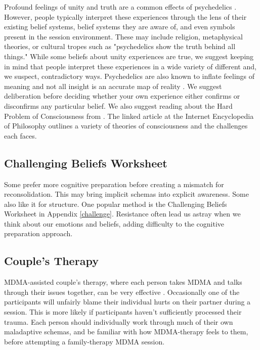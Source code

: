 \documentclass[12pt,letterpaper]{book}
\begin{document}
Profound feelings of unity and truth are a common effects of psychedelics \cite{yaden2022varieties}. However, people typically interpret these experiences through the lens of their existing belief systems, belief systems they are aware of, and even symbols present in the session environment. These may include religion, metaphysical theories, or cultural tropes such as "psychedelics show the truth behind all things." While some beliefs about unity experiences are true, we suggest keeping in mind that people interpret these experiences in a wide variety of different and, we suspect, contradictory ways. Psychedelics are also known to inflate feelings of meaning and not all insight is an accurate map of reality \cite{hartogsohn2018meaning,tulverInsight}. We suggest deliberation before deciding whether your own experience either confirms or disconfirms any particular belief. We also suggest reading about the Hard Problem of Consciousness from \textcite{hardProblem}. The linked article at the Internet Encyclopedia of Philosophy outlines a variety of theories of consciousness and the challenges each faces.
\subsection{Challenging Beliefs Worksheet}
\label{challengingBeliefsWorksheet}
Some prefer more cognitive preparation before creating a mismatch for reconsolidation.  This may bring implicit schemas into explicit awareness. Some also like it for structure. One popular method is the Challenging Beliefs Worksheet in Appendix \ref{challenge}. Resistance often lead us astray when we think about our emotions and beliefs, adding difficulty to the cognitive preparation approach.
\subsection{Couple's Therapy}
MDMA-assisted couple's therapy, where each person takes MDMA and talks through their issues together, can be very effective \cite{colbertEvenings}. Occasionally one of the participants will unfairly blame their individual hurts on their partner during a session. This is more likely if participants haven't sufficiently processed their trauma. Each person should individually work through much of their own maladaptive schemas, and be familiar with how MDMA-therapy feels to them, before attempting a family-therapy MDMA session.
\end{document}
